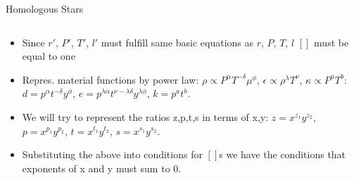\begin{frame}{Homologous Stars}
\begin{columns}[T]
\begin{column}{0.45\textwidth}
\begin{itemize}
                \item Since $r'$, $P'$, $T'$, $l'$ must fulfill same basic equations as $r$, $P$, $T$, $l$ $[]$ must be equal to one
                \item Repres. material functions by power law: $\rho\propto P^{\alpha}T^{-\delta}\mu^{\phi}$, $\epsilon\propto\rho^{\lambda}T^{\nu}$, $\kappa\propto P^aT^b$: $d=p^{\alpha}t^{-\delta}y^{\phi}$, $e=p^{\lambda\alpha}t^{\nu-\lambda\delta}y^{\lambda\phi}$, $k=p^at^b$.
                \item We will try to represent the ratios z,p,t,s in terms of x,y: $z=x^{z_1}y^{z_2}$, $p=x^{p_1}y^{p_2}$, $t=x^{t_1}y^{t_2}$, $s=x^{s_1}y^{s_2}$.
                \item Substituting the above into conditions for $[]$s we have the conditions that exponents of x and y must sum to 0.
            \end{itemize}
        \end{column}
    \end{columns}
\end{frame}

